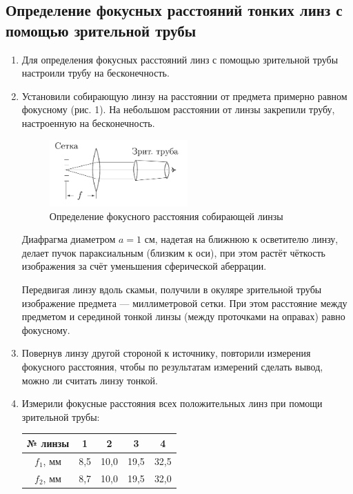 \documentclass[a4paper, 12pt]{article}%
\begin{document}
	\subsection{Определение фокусных расстояний тонких линз с помощью зрительной трубы}
	\begin{enumerate}
		\item Для определения фокусных расстояний линз с помощью зрительной трубы настроили трубу на бесконечность.
		
		\item Установили собирающую линзу на расстоянии от предмета примерно равном фокусному (рис. 1). На небольшом расстоянии от линзы закрепили трубу, настроенную на бесконечность.
							
		\begin{figure}
			\begin{center}
				\includegraphics[width = 0.5\textwidth]{pic/412-1.png}
				\caption{Определение фокусного расстояния собирающей линзы}
			\end{center}
		\end{figure}
			
		Диафрагма диаметром $a=1$ см, надетая на ближнюю к осветителю линзу, делает пучок параксиальным (близким к оси), при этом растёт чёткость изображения за счёт уменьшения сферической аберрации.
		
		Передвигая линзу вдоль скамьи, получили в окуляре зрительной трубы
		изображение предмета --- миллиметровой сетки. При этом расстояние между
		предметом и серединой тонкой линзы (между проточками на оправах) равно фокусному.
		
		\item Повернув линзу другой стороной к источнику, повторили измерения фокусного расстояния, чтобы по результатам измерений сделать вывод, можно ли считать линзу тонкой.
		
		\item  Измерили фокусные расстояния всех положительных линз при помощи зрительной трубы:
		
		\begin{center}
			\begin{tabular}{|c|c|c|c|c|}
				\hline
				№ линзы & 1 & 2 & 3 & 4 \\ \hline
				$f_1$, мм & 8,5 & 10,0 & 19,5 & 32,5 \\ \hline
				$f_2$, мм & 8,7 & 10,0 & 19,5 & 32,0 \\ \hline
			\end{tabular}
		\end{center}
	

\end{enumerate}
\end{document}
